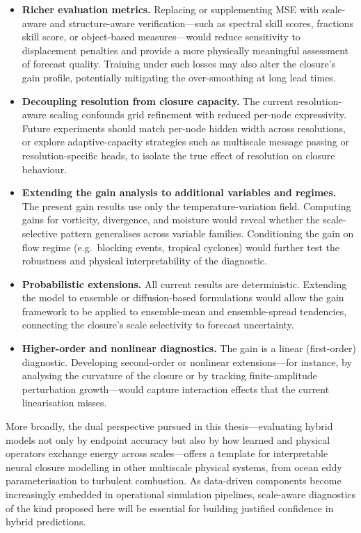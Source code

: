 \begin{itemize}
    \item \textbf{Richer evaluation metrics.} Replacing or supplementing MSE with scale-aware and structure-aware verification---such as spectral skill scores, fractions skill score, or object-based measures---would reduce sensitivity to displacement penalties and provide a more physically meaningful assessment of forecast quality. Training under such losses may also alter the closure's gain profile, potentially mitigating the over-smoothing at long lead times.

    \item \textbf{Decoupling resolution from closure capacity.} The current resolution-aware scaling confounds grid refinement with reduced per-node expressivity. Future experiments should match per-node hidden width across resolutions, or explore adaptive-capacity strategies such as multiscale message passing or resolution-specific heads, to isolate the true effect of resolution on closure behaviour.

    \item \textbf{Extending the gain analysis to additional variables and regimes.} The present gain results use only the temperature-variation field. Computing gains for vorticity, divergence, and moisture would reveal whether the scale-selective pattern generalises across variable families. Conditioning the gain on flow regime (e.g.\ blocking events, tropical cyclones) would further test the robustness and physical interpretability of the diagnostic.

    \item \textbf{Probabilistic extensions.} All current results are deterministic. Extending the model to ensemble or diffusion-based formulations would allow the gain framework to be applied to ensemble-mean and ensemble-spread tendencies, connecting the closure's scale selectivity to forecast uncertainty.

    \item \textbf{Higher-order and nonlinear diagnostics.} The gain is a linear (first-order) diagnostic. Developing second-order or nonlinear extensions---for instance, by analysing the curvature of the closure or by tracking finite-amplitude perturbation growth---would capture interaction effects that the current linearisation misses.
\end{itemize}

More broadly, the dual perspective pursued in this thesis---evaluating hybrid models not only by endpoint accuracy but also by how learned and physical operators exchange energy across scales---offers a template for interpretable neural closure modelling in other multiscale physical systems, from ocean eddy parameterisation to turbulent combustion. As data-driven components become increasingly embedded in operational simulation pipelines, scale-aware diagnostics of the kind proposed here will be essential for building justified confidence in hybrid predictions.

